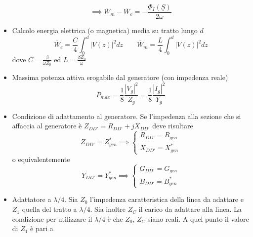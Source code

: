 \documentclass{book}
\begin{document}
\begin{itemize}
            \begin{equation}
                \implies \overline{W}_{m}-\overline{W}_{e} = -\frac{\Phi_{I}(\underline{S})}{2\omega}
            \end{equation}
            \item Calcolo energia elettrica (o magnetica) media su tratto lungo $d$
            \begin{equation}
                \overline{W}_{e} = \frac{C}{4} \int_{0} ^{d} |V(z)| ^{2} dz \qquad \overline{W}_{m} = \frac{L}{4} \int_{0} ^{d} |V(z)| ^{2} dz
            \end{equation}
            dove $\displaystyle C=\frac{\beta}{\omega Z_{0}}$ ed $L=\displaystyle \frac{\beta Z_{0}}{\omega}$
            \item Massima potenza attiva erogabile dal generatore (con impedenza reale)
            \begin{equation}
                \overline{P}_{max} = \frac{1}{8}\frac{|V_{g}| ^{2}}{Z_{g}} = \frac{1}{8}\frac{|I_{g}| ^{2}}{Y_{g}}
            \end{equation}
            \item Condizione di adattamento al generatore. Se l'impedenza alla sezione che si affaccia al generatore è $Z_{DD'} = R_{DD'}+jX_{DD'}$ deve risultare
            \begin{equation}
                Z_{DD'} = Z_{gen} ^{*} \implies
                \begin{cases}
                    R_{DD'} = R_{gen} \\
                    X_{DD'} = X_{gen} ^{*}
                \end{cases}
            \end{equation}
            o equivalentemente
            \begin{equation}
                Y_{DD'} = Y_{gen} ^{*} \implies
                \begin{cases}
                    G_{DD'} = G_{gen} \\
                    B_{DD'} = B_{gen} ^{*}
                \end{cases}
            \end{equation}
            \item Adattatore a $\lambda/4$. Sia $Z_{0}$ l'impedenza caratteristica della linea da adattare e $Z_{1}$ quella del tratto
            a $\lambda/4$. Sia inoltre $Z_{C}$ il carico da adattare alla linea. La condizione per utilizzare il $\lambda/4$ è che $Z_{0}$, $Z_{C}$ siano
            reali. A quel punto il valore di $Z_{1}$ è pari a 

\end{itemize}
\end{document}
